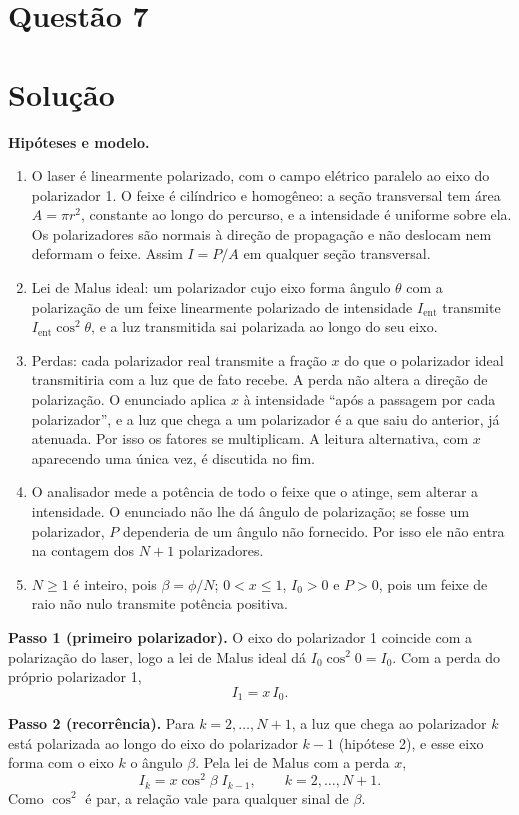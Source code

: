 \documentclass{article}%
\begin{document}
\section*{Questão 7}

\section*{Solução}

\textbf{Hipóteses e modelo.}
\begin{enumerate}
\item O laser é linearmente polarizado, com o campo elétrico paralelo ao eixo do polarizador 1. O feixe é cilíndrico e homogêneo: a seção transversal tem área $A=\pi r^2$, constante ao longo do percurso, e a intensidade é uniforme sobre ela. Os polarizadores são normais à direção de propagação e não deslocam nem deformam o feixe. Assim $I=P/A$ em qualquer seção transversal.
\item Lei de Malus ideal: um polarizador cujo eixo forma ângulo $\theta$ com a polarização de um feixe linearmente polarizado de intensidade $I_{\text{ent}}$ transmite $I_{\text{ent}}\cos^2\theta$, e a luz transmitida sai polarizada ao longo do seu eixo.
\item Perdas: cada polarizador real transmite a fração $x$ do que o polarizador ideal transmitiria com a luz que de fato recebe. A perda não altera a direção de polarização. O enunciado aplica $x$ à intensidade ``após a passagem por cada polarizador'', e a luz que chega a um polarizador é a que saiu do anterior, já atenuada. Por isso os fatores se multiplicam. A leitura alternativa, com $x$ aparecendo uma única vez, é discutida no fim.
\item O analisador mede a potência de todo o feixe que o atinge, sem alterar a intensidade. O enunciado não lhe dá ângulo de polarização; se fosse um polarizador, $P$ dependeria de um ângulo não fornecido. Por isso ele não entra na contagem dos $N+1$ polarizadores.
\item $N\ge 1$ é inteiro, pois $\beta=\phi/N$; $0<x\le 1$, $I_0>0$ e $P>0$, pois um feixe de raio não nulo transmite potência positiva.
\end{enumerate}

\textbf{Passo 1 (primeiro polarizador).} O eixo do polarizador 1 coincide com a polarização do laser, logo a lei de Malus ideal dá $I_0\cos^2 0=I_0$. Com a perda do próprio polarizador 1,
\[
I_1 = x\,I_0 .
\]

\textbf{Passo 2 (recorrência).} Para $k=2,\dots,N+1$, a luz que chega ao polarizador $k$ está polarizada ao longo do eixo do polarizador $k-1$ (hipótese 2), e esse eixo forma com o eixo $k$ o ângulo $\beta$. Pela lei de Malus com a perda $x$,
\[
I_k = x\cos^2\beta\; I_{k-1}, \qquad k=2,\dots,N+1 .
\]
Como $\cos^2$ é par, a relação vale para qualquer sinal de $\beta$.
\end{document}
